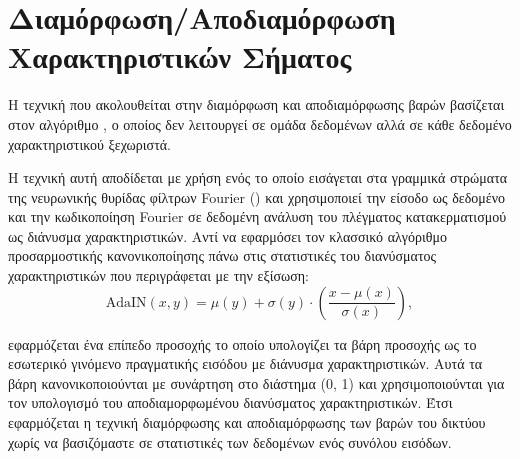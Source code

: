 \section{Διαμόρφωση/Αποδιαμόρφωση Χαρακτηριστικών Σήματος}
\par
    H τεχνική που ακολουθείται στην διαμόρφωση και αποδιαμόρφωσης βαρών βασίζεται στον αλγόριθμο , ο οποίος δεν λειτουργεί σε ομάδα δεδομένων αλλά σε κάθε δεδομένο χαρακτηριστικού ξεχωριστά. 

\par    
    Η τεχνική αυτή αποδίδεται με χρήση ενός  το οποίο εισάγεται στα γραμμικά στρώματα της νευρωνικής θυρίδας φίλτρων Fourier () και χρησιμοποιεί την είσοδο ως δεδομένο και την κωδικοποίηση Fourier σε δεδομένη ανάλυση του πλέγματος κατακερματισμού ως διάνυσμα χαρακτηριστικών. Αντί να εφαρμόσει τον κλασσικό αλγόριθμο προσαρμοστικής κανονικοποίησης πάνω στις στατιστικές του διανύσματος χαρακτηριστικών που περιγράφεται με την εξίσωση:
    \begin{equation}
    \text{AdaIN}(x, y) = \mu(y) + \sigma(y) \cdot (\frac{x - \mu(x)}{\sigma(x)}),        
    \label{eq:AdaIN}
    \end{equation}

    εφαρμόζεται ένα επίπεδο προσοχής το οποίο υπολογίζει τα βάρη προσοχής ως το εσωτερικό γινόμενο πραγματικής εισόδου με διάνυσμα χαρακτηριστικών. Αυτά τα βάρη κανονικοποιούνται με συνάρτηση  στο διάστημα (0, 1) και χρησιμοποιούνται για τον υπολογισμό του αποδιαμορφωμένου διανύσματος χαρακτηριστικών. Έτσι εφαρμόζεται η τεχνική διαμόρφωσης και αποδιαμόρφωσης των βαρών του δικτύου χωρίς να βασιζόμαστε σε στατιστικές των δεδομένων ενός συνόλου εισόδων.

    